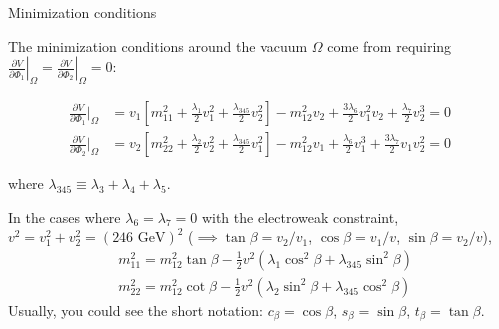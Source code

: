 \documentclass{../bredelebeamer}
\begin{document}
\begin{frame}{Minimization conditions}

    The minimization conditions around the vacuum $\Omega$ come from requiring $\left.\frac{\partial V}{\partial \Phi_1}\right|_{\Omega} = \left.\frac{\partial V}{\partial \Phi_2}\right|_{\Omega} = 0$:

    \begin{align}
        \frac{\partial V}{\partial \Phi_1}\bigg|_{\Omega} &= v_1\left[m_{11}^2 + \frac{\lambda_1}{2}v_1^2 + \frac{\lambda_{345}}{2}v_2^2\right] - m_{12}^2 v_2 + \frac{3\lambda_6}{2}v_1^2 v_2 + \frac{\lambda_7}{2}v_2^3 = 0 \\
        \frac{\partial V}{\partial \Phi_2}\bigg|_{\Omega} &= v_2\left[m_{22}^2 + \frac{\lambda_2}{2}v_2^2 + \frac{\lambda_{345}}{2}v_1^2\right] - m_{12}^2 v_1 + \frac{\lambda_6}{2}v_1^3 + \frac{3\lambda_7}{2}v_1 v_2^2 = 0
    \end{align}

    where $\lambda_{345} \equiv \lambda_3 + \lambda_4 + \lambda_5$.

    \vfill\pause
    In the cases where $\lambda_6 = \lambda_7 = 0$ with the electroweak constraint, $v^2 = v_1^2 + v_2^2 = (246 \text{ GeV})^2$ ($\implies \tan\beta = v_2/v_1$, $\cos\beta = v_1/v$, $\sin\beta = v_2/v$),
    \begin{align}
        & m_{11}^2 = m_{12}^2 \tan\beta - \frac{1}{2} v^2\left(\lambda_1 \cos^2\beta + \lambda_{345} \sin^2\beta\right) \\
        & m_{22}^2 = m_{12}^2 \cot\beta - \frac{1}{2} v^2\left(\lambda_2 \sin^2\beta + \lambda_{345} \cos^2\beta\right)
    \end{align}
    Usually, you could see the short notation: $c_\beta = \cos\beta$, $s_\beta = \sin\beta$, $t_\beta = \tan\beta$.
\end{frame}
\end{document}
